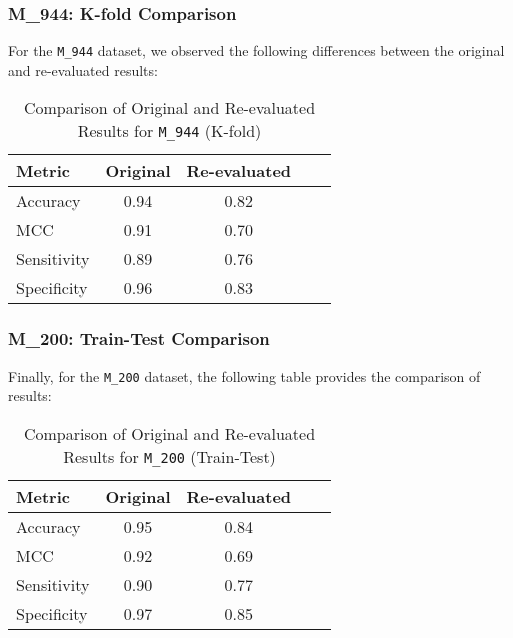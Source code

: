     \subsubsection{M\_944: K-fold Comparison}

      For the \texttt{M\_944} dataset, we observed the following differences between the original and re-evaluated results:

      \begin{table}[h]
        \centering
        \caption{Comparison of Original and Re-evaluated Results for \texttt{M\_944} (K-fold)}
        \begin{tabular}{lcccc}
          \hline
          \textbf{Metric} & \textbf{Original} & \textbf{Re-evaluated} \\
          \hline
          Accuracy        & 0.94              & 0.82                  \\
          MCC             & 0.91              & 0.70                  \\
          Sensitivity     & 0.89              & 0.76                  \\
          Specificity     & 0.96              & 0.83                  \\
          \hline
        \end{tabular}
      \end{table}

    \subsubsection{M\_200: Train-Test Comparison}

      Finally, for the \texttt{M\_200} dataset, the following table provides the comparison of results:

      \begin{table}[h]
        \centering
        \caption{Comparison of Original and Re-evaluated Results for \texttt{M\_200} (Train-Test)}
        \begin{tabular}{lcccc}
          \hline
          \textbf{Metric} & \textbf{Original} & \textbf{Re-evaluated} \\
          \hline
          Accuracy        & 0.95              & 0.84                  \\
          MCC             & 0.92              & 0.69                  \\
          Sensitivity     & 0.90              & 0.77                  \\
          Specificity     & 0.97              & 0.85                  \\
          \hline
        \end{tabular}
      \end{table}

